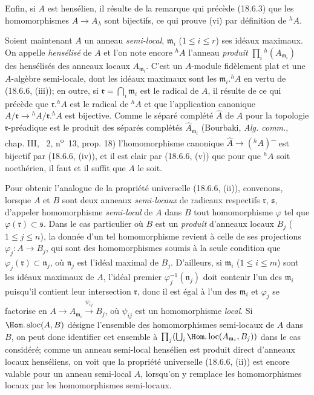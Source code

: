 Enfin, si $A$ est hensélien, il résulte de la remarque qui précède (18.6.3) que les homomorphismes $A\to A_\lambda$ sont bijectifs, ce qui prouve (vi) par définition de ${}^h\!A$.

\begin{env}[18.6.7]
Soient maintenant $A$ un anneau \emph{semi-local}, $\mathfrak m_i$ ($1\leq i\leq r$) ses idéaux maximaux. On appelle \emph{hensélisé} de $A$ et l'on note encore ${}^h\!A$ l'anneau \emph{produit} $\prod_i{}^h(A_{\mathfrak m_i})$ des hensélisés des anneaux locaux $A_{\mathfrak m_i}$. C'est un $A$-module fidèlement plat et une $A$-algèbre semi-locale, dont les idéaux maximaux sont les $\mathfrak m_i.{}^h\!A$ en vertu de (18.6.6, (iii)); en outre, si $\mathfrak r=\bigcap_i\mathfrak m_i$ est le radical de $A$, il résulte de ce qui précède que $\mathfrak r.{}^h\!A$
est le radical de ${}^h\!A$ et que l'application canonique $A/\mathfrak r\to{}^h\!A/\mathfrak r.{}^h\!A$ est bijective. Comme le séparé complété $\widehat A$ de $A$ pour la topologie $\mathfrak r$-préadique est le produit des séparés complétés $\widehat A_{\mathfrak m_i}$ (Bourbaki, \emph{Alg. comm.}, chap. III, \textsection~2, n\textsuperscript{o}~13, prop. 18) l'homomorphisme canonique $\widehat A\to({}^h\!A)\widehat{\phantom{x}}$ est bijectif par (18.6.6, (iv)), et il est clair par (18.6.6, (v)) que pour que ${}^h\!A$ soit noethérien, il faut et il suffit que $A$ le soit.

Pour obtenir l'analogue de la propriété universelle (18.6.6, (ii)), convenons, lorsque $A$ et $B$ sont deux anneaux \emph{semi-locaux} de radicaux respectifs $\mathfrak r$, $\mathfrak s$, d'appeler homomorphisme \emph{semi-local} de $A$ dans $B$ tout homomorphisme $\varphi$ tel que $\varphi(\mathfrak r)\subset\mathfrak s$. Dans le cas particulier où $B$ est un \emph{produit} d'anneaux locaux $B_j$ ($1\leq j\leq n$), la donnée d'un tel homomorphisme revient à celle de ses projections $\varphi_j:A\to B_j$, qui sont des homomorphismes soumis à la seule condition que $\varphi_j(\mathfrak r)\subset\mathfrak n_j$, où $\mathfrak n_j$ est l'idéal maximal de $B_j$. D'ailleurs, si $\mathfrak m_i$ ($1\leq i\leq m$) sont les idéaux maximaux de $A$, l'idéal premier $\varphi_j^{-1}(\mathfrak n_j)$ doit contenir l'un des $\mathfrak m_i$ puisqu'il contient leur intersection $\mathfrak r$, donc il est égal à l'un des $\mathfrak m_i$ et $\varphi_j$ se factorise en $A\to A_{\mathfrak m_i}\xrightarrow{\psi_{ij}}B_j$, où $\psi_{ij}$ est un homomorphisme \emph{local}. Si $\Hom.\operatorname{sloc}(A,B)$ désigne l'ensemble des homomorphismes semi-locaux de $A$ dans $B$, on peut donc identifier cet ensemble à $\prod_j(\bigcup_i\Hom.\operatorname{loc}(A_{\mathfrak m_i},B_j))$ dans le cas considéré; comme un anneau semi-local hensélien est produit direct d'anneaux locaux henséliens, on voit que la propriété universelle (18.6.6, (ii)) est encore valable pour un anneau semi-local $A$, lorsqu'on y remplace les homomorphismes locaux par les homomorphismes semi-locaux.
\end{env}

